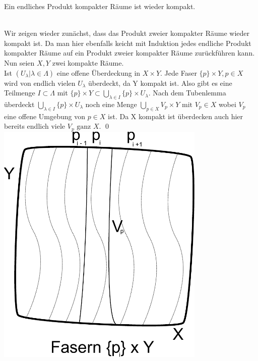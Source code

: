 \begin{Satz}
	Ein endliches Produkt kompakter Räume ist wieder kompakt.
\end{Satz}
	\\
	Wir zeigen wieder zunächst, dass das Produkt zweier kompakter Räume wieder kompakt ist. Da man hier ebenfalls keicht mit Induktion jedes endliche Produkt kompakter Räume 
	auf ein Produkt zweier kompakter Räume zurückführen kann. \\
	Nun seien \(X, Y\) zwei kompakte Räume.\\
	Ist \((U_{\lambda} | \lambda \in \Lambda) \) eine offene Überdeckung in \(X \times Y \). Jede Faser \( \{p\} \times Y, p \in X \) wird von endlich vielen \(U_{\lambda} \) überdeckt,
	da Y kompakt ist. Also gibt es eine Teilmenge \( I \subset \Lambda \) mit \( \{p\} \times Y \subset \bigcup_{ \lambda \in I } \{p\} \times U_{\lambda} \). 
	Nach dem Tubenlemma überdeckt \( \bigcup_{ \lambda \in I } \{p\} \times U_{\lambda} \) noch eine Menge \(\bigcup_{ p \in X } V_{p} \times Y \mbox{ mit } V_{p} \in X \) 
	wobei \( V_{p} \) eine offene Umgebung von \( p \in X \) ist. Da X kompakt ist überdecken auch hier bereits endlich viele \(V_{p} \mbox{ ganz } X \). 
	\qed\\
	\includegraphics[width=10cm]{produkt_kompakter_raueme.pdf}
	
